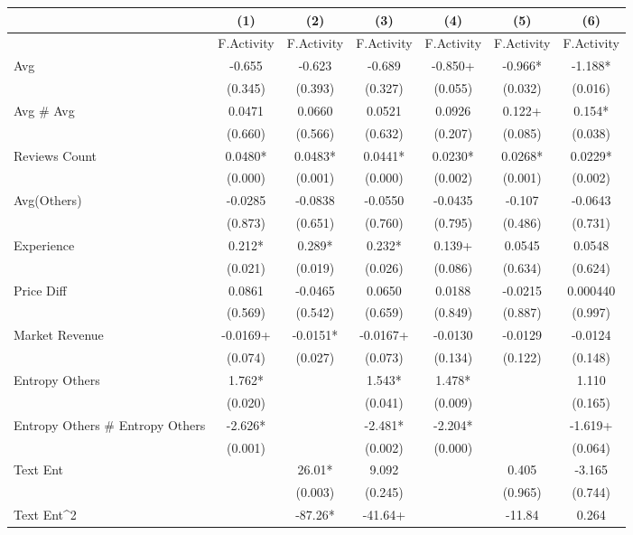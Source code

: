 \begin{table}
\centering
\begin{tabular}{@{}lcccccc@{}}
\toprule
 & (1) & (2) & (3) & (4) & (5) & (6) \\ \midrule
 & F.Activity & F.Activity & F.Activity & F.Activity & F.Activity & F.Activity \\
Avg & -0.655 & -0.623 & -0.689 & -0.850+ & -0.966* & -1.188* \\
 & (0.345) & (0.393) & (0.327) & (0.055) & (0.032) & (0.016) \\
Avg \# Avg & 0.0471 & 0.0660 & 0.0521 & 0.0926 & 0.122+ & 0.154* \\
 & (0.660) & (0.566) & (0.632) & (0.207) & (0.085) & (0.038) \\
Reviews Count & 0.0480* & 0.0483* & 0.0441* & 0.0230* & 0.0268* & 0.0229* \\
 & (0.000) & (0.001) & (0.000) & (0.002) & (0.001) & (0.002) \\
Avg(Others) & -0.0285 & -0.0838 & -0.0550 & -0.0435 & -0.107 & -0.0643 \\
 & (0.873) & (0.651) & (0.760) & (0.795) & (0.486) & (0.731) \\
Experience & 0.212* & 0.289* & 0.232* & 0.139+ & 0.0545 & 0.0548 \\
 & (0.021) & (0.019) & (0.026) & (0.086) & (0.634) & (0.624) \\
Price Diff & 0.0861 & -0.0465 & 0.0650 & 0.0188 & -0.0215 & 0.000440 \\
 & (0.569) & (0.542) & (0.659) & (0.849) & (0.887) & (0.997) \\
Market Revenue & -0.0169+ & -0.0151* & -0.0167+ & -0.0130 & -0.0129 & -0.0124 \\
 & (0.074) & (0.027) & (0.073) & (0.134) & (0.122) & (0.148) \\
Entropy Others & 1.762* &  & 1.543* & 1.478* &  & 1.110 \\
 & (0.020) &  & (0.041) & (0.009) &  & (0.165) \\
Entropy Others \# Entropy Others & -2.626* &  & -2.481* & -2.204* &  & -1.619+ \\
 & (0.001) &  & (0.002) & (0.000) &  & (0.064) \\
Text Ent &  & 26.01* & 9.092 &  & 0.405 & -3.165 \\
 &  & (0.003) & (0.245) &  & (0.965) & (0.744) \\
Text Ent\textasciicircum{}2 &  & -87.26* & -41.64+ &  & -11.84 & 0.264 \\

\end{tabular}
\end{table}
